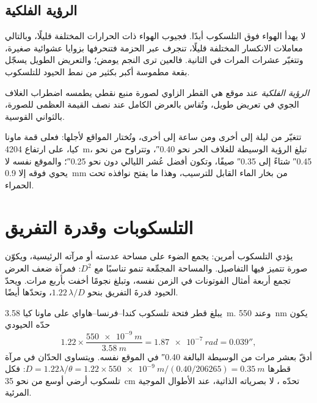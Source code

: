 \subsection*{الرؤية الفلكية}

لا يهدأ الهواء فوق التلسكوب أبدًا. فجيوب الهواء ذات الحرارات المختلفة قليلًا، وبالتالي معاملات الانكسار المختلفة قليلًا، تنجرف عبر الحزمة فتنحرفها بزوايا عشوائية صغيرة، وتتغيّر عشرات المرات في الثانية. فالعين ترى النجم يومض؛ والتعريض الطويل يسجّل بقعة مطموسة أكبر بكثير من نمط الحيود للتلسكوب.

\begin{definition}\label{def:b1:observing-the-sky:seeing}
\emph{الرؤية الفلكية} عند موقع هي القطر الزاوي لصورة منبع نقطي يطمسه اضطراب الغلاف الجوي في تعريض طويل، وتُقاس بالعرض الكامل عند نصف القيمة العظمى للصورة، بالثواني القوسية.
\end{definition}

تتغيّر  من ليلة إلى أخرى ومن ساعة إلى أخرى، وتُختار المواقع لأجلها: فعلى قمة ماونا كيا، على ارتفاع \qty{4204}{m}، تبلغ الرؤية الوسيطة للغلاف الحر نحو \ang{;;0.40}، وتتراوح من نحو \ang{;;0.45} شتاءً إلى \ang{;;0.35} صيفًا، وتكون أفضل عُشر الليالي دون نحو \ang{;;0.25}؛ والموقع نفسه لا يحوي فوقه إلا \qty{0.9}{mm} من بخار الماء القابل للترسيب، وهذا ما يفتح نوافذه تحت الحمراء.

\section{التلسكوبات وقدرة التفريق}

يؤدي التلسكوب أمرين: يجمع الضوء على مساحة عدسته أو مرآته الرئيسية، ويكوّن صورة تتميز فيها التفاصيل. والمساحة المجمِّعة تنمو تناسبًا مع $D^2$: فمرآة ضعف العرض تجمع أربعة أمثال الفوتونات في الزمن نفسه، وتبلغ نجومًا أخفت بأربع مرات. ويحدّ الحيود قدرةَ التفريق بنحو $1.22\,\lambda/D$، وتحدّها  أيضًا.

\begin{example}
يبلغ قطر فتحة تلسكوب كندا–فرنسا–هاواي على ماونا كيا \qty{3.58}{m}. وعند \qty{550}{nm} يكون حدّه الحيودي
\[
  1.22\times\frac{\qty{550e-9}{m}}{\qty{3.58}{m}} = \qty{1.87e-7}{rad}
  = \ang{;;0.039},
\]
أدقّ بعشر مرات من  الوسيطة البالغة \ang{;;0.40} في الموقع نفسه. ويتساوى الحدّان في مرآة قطرها $D = 1.22\lambda/\theta =
1.22\times\qty{550e-9}{m}/(\num{0.40}/\num{206265}) = \qty{0.35}{m}$: فكل تلسكوب أرضي أوسع من نحو \qty{35}{cm} تحدّه ، لا بصرياته الذاتية، عند الأطوال الموجية المرئية.
\end{example}

